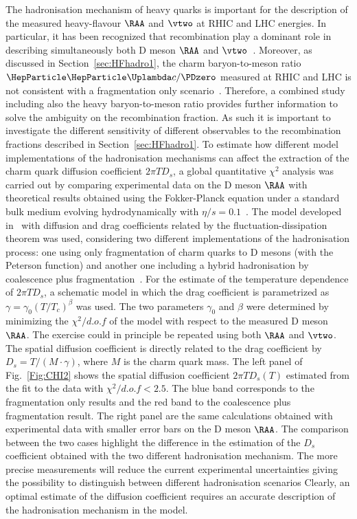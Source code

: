 The hadronisation mechanism of heavy quarks is important for the description of the measured
heavy-flavour $\RAA$ and $\vtwo$ at RHIC and LHC energies. In particular, it has been recognized that recombination
play a dominant role in describing simultaneously both D meson $\RAA$ and $\vtwo$~\cite{Gossiaux:2008jv,He:2011qa,Scardina:2017ipo}.
Moreover, as discussed in Section~\ref{sec:HFhadro1}, the charm baryon-to-meson ratio $\PGLc/\PDzero$ measured at RHIC and LHC is not consistent with a fragmentation only scenario~\cite{Oh:2009zj,Plumari:2017ntm}.
Therefore, a combined study including also the heavy baryon-to-meson ratio provides further
information to solve the ambiguity on the
recombination fraction. As such it is important to investigate the different sensitivity
of different observables to the
recombination fractions described in Section~\ref{sec:HFhadro1}.
To estimate how different model implementations of the hadronisation mechanisms can affect the extraction of the charm quark diffusion coefficient $2\pi T D_s$,
a global quantitative $\chi^2$ analysis was carried out by comparing experimental data on the D meson $\RAA$ with theoretical
results obtained using the Fokker-Planck equation under a standard bulk medium evolving
hydrodynamically with $\eta/s=0.1$~\cite{Plumari:2015cfa,Ruggieri:2013ova}.
The model developed in~\cite{Das:2015ana,Das:2013kea} with diffusion and drag
coefficients related by the fluctuation-dissipation theorem was used, considering two different
implementations of the hadronisation process: one using only fragmentation of charm quarks to D mesons (with the Peterson function)
and another one including a hybrid hadronisation by coalescence plus fragmentation~\cite{Plumari:2017ntm,Scardina:2017ipo}.
For the estimate of the temperature dependence of $2\pi T D_s$, a schematic model in which the
drag coefficient is parametrized as $\gamma=\gamma_0 (T/T_{c})^{\beta}$ was used. The two parameters $\gamma_0$ and $\beta$ were determined by minimizing the
$\chi^2/d.o.f$ of the model with respect to the measured D meson $\RAA$. The exercise could in principle be repeated using both $\RAA$ and $\vtwo$. 
The spatial diffusion coefficient is directly related to
the drag coefficient by $D_s=T/(M\cdot\gamma)$, where $M$ is the charm quark mass.
The left panel of Fig.~\ref{Fig:CHI2} shows the spatial diffusion coefficient
$2 \pi T D_s(T)$ estimated from the fit to the data with $\chi^2/d.o.f < 2.5$. The blue band corresponds to the fragmentation 
only results and the red band to the coalescence plus fragmentation result.
The right panel are the same calculations obtained with experimental data 
with smaller error bars on the D meson $\RAA$.
The comparison between the two cases highlight the difference in the estimation 
of the $D_s$ coefficient obtained with the two different hadronisation mechanism.
The more precise measurements will reduce the current experimental uncertainties
giving the possibility to distinguish between different hadronisation scenarios
Clearly, an optimal estimate of the diffusion coefficient requires an accurate description of the hadronisation mechanism in the model.



